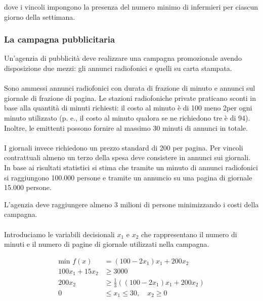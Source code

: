 \documentclass[a4paper, 11pt]{article}
\begin{document}
            dove i vincoli impongono la presenza del numero minimo di infermieri per ciascun giorno della
            settimana.
            
            \subsubsection*{La campagna pubblicitaria}

            Un’agenzia di pubblicità deve realizzare una campagna promozionale avendo disposizione due mezzi: gli annunci radiofonici e quelli su carta stampata.
            
            \paragraph{}
            Sono ammessi annunci radiofonici con durata di frazione di minuto e annunci sul giornale di frazione di pagina. Le stazioni radiofoniche private praticano sconti in base alla quantità di minuti richiesti: il costo al minuto è di 100 meno 2per ogni minuto utilizzato (p. e., il costo al minuto qualora se ne richiedono tre è di 94). Inoltre, le emittenti possono fornire al massimo 30 minuti di annunci in totale.

            \paragraph{}
            I giornali invece richiedono un prezzo standard di 200 per pagina. Per vincoli contrattuali almeno un terzo della spesa deve consistere in annunci sui giornali. In base ai risultati statistici si stima che tramite un minuto di annunci radiofonici si raggiungono 100.000 persone e tramite un annuncio su una pagina di giornale 15.000 persone. 
            
            L’agenzia deve raggiungere almeno 3 milioni di persone minimizzando i costi della campagna.

            \paragraph{}
            Introduciamo le variabili decisionali $x_1$ e $x_2$ che rappresentano il numero di minuti e il numero di pagine di giornale utilizzati nella
            campagna.
            
            \begin{align*}
                \text{min } f(x) &= (100 - 2x_1)x_1 + 200x_2 \\
                100x_1 + 15x_2 &\ge 3000 \\
                200x_2 &\ge \frac{1}{3}((100 - 2x_1)x_1 + 200x_2) \\
                0 &\le x_1 \le 30, \quad x_2 \ge 0
            \end{align*}
            
\end{document}
